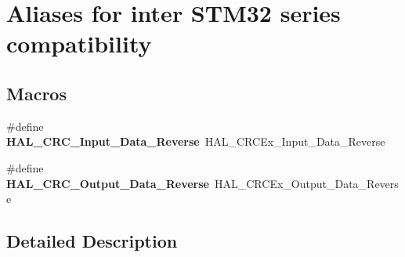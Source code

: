 \hypertarget{group___c_r_c___aliases}{}\section{Aliases for inter S\+T\+M32 series compatibility}
\label{group___c_r_c___aliases}
\subsection*{Macros}
\begin{DoxyCompactItemize}
\item 
\mbox{\label{group___c_r_c___aliases_ga1740ace1886a861bdd009f9b841a6d88}} 
\#define {\bfseries H\+A\+L\+\_\+\+C\+R\+C\+\_\+\+Input\+\_\+\+Data\+\_\+\+Reverse}~H\+A\+L\+\_\+\+C\+R\+C\+Ex\+\_\+\+Input\+\_\+\+Data\+\_\+\+Reverse
\item 
\mbox{\label{group___c_r_c___aliases_ga27037619e08342b7855dd25d384c1b37}} 
\#define {\bfseries H\+A\+L\+\_\+\+C\+R\+C\+\_\+\+Output\+\_\+\+Data\+\_\+\+Reverse}~H\+A\+L\+\_\+\+C\+R\+C\+Ex\+\_\+\+Output\+\_\+\+Data\+\_\+\+Reverse
\end{DoxyCompactItemize}


\subsection{Detailed Description}
